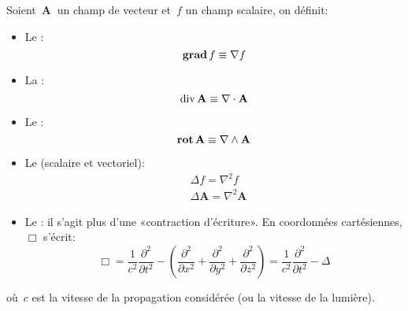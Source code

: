 \medskip
Soient~$\mathbf{A}~$ un champ de vecteur et~$f$ un champ scalaire, on définit:
\begin{itemize}
\item Le :
\begin{equation} \operatorname{\mathbf{grad}} f \equiv \nabla f \end{equation}

\item La :
\begin{equation} \operatorname{div} \mathbf{A} \equiv \nabla\cdot\mathbf{A} \end{equation}

\item Le :
\begin{equation} \operatorname{\mathbf{rot}} \mathbf{A} \equiv \nabla \wedge \mathbf{A} \end{equation}

\item Le  (scalaire et vectoriel):
\begin{align} &\Delta f = \nabla^2 f\\
&\Delta \mathbf{A} = \nabla^2 \mathbf{A} \end{align}

\item Le : il s'agit plus d'une «contraction d'écriture».
En coordonnées cartésiennes, $\Box$ s'écrit:
\begin{equation}
  \Box = \frac{1}{c^2}\frac{\partial^2}{\partial t^2} - \left(\frac{\partial^2}{\partial x^2} + \frac{\partial^2}{\partial y^2} + \frac{\partial^2}{\partial z^2}\right)
  = \frac{1}{c^2}\frac{\partial^2}{\partial t^2} - \Delta
\end{equation}
\end{itemize}
où~$c$ est la vitesse de la propagation considérée (ou la vitesse de la lumière).

